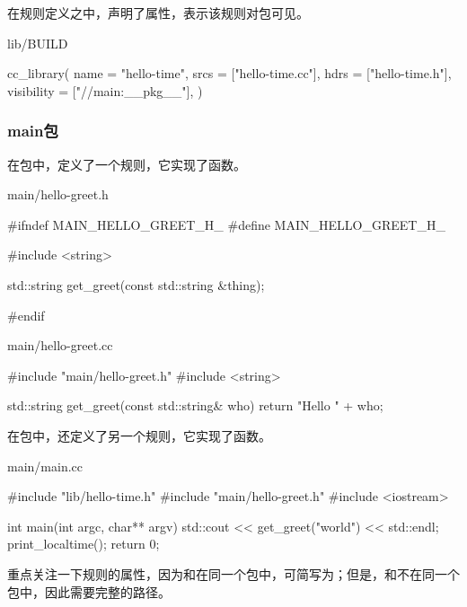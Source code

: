 \begin{content}
在规则定义之中，声明了属性，表示该规则对包可见。

\begin{nodiff}{lib/BUILD}
 \begin{python}
cc_library(
    name = "hello-time", 
    srcs = ["hello-time.cc"], 
    hdrs = ["hello-time.h"],  
    visibility = ["//main:__pkg__"],
)
 \end{python}
\end{nodiff}

\subsubsection{main包}

在包中，定义了一个规则，它实现了函数。

\begin{nodiff}{main/hello-greet.h}
 \begin{c++}
#ifndef MAIN_HELLO_GREET_H_
#define MAIN_HELLO_GREET_H_

#include <string>

std::string get_greet(const std::string &thing);
      
#endif
 \end{c++}
\end{nodiff}

\begin{nodiff}{main/hello-greet.cc}
 \begin{c++}
#include "main/hello-greet.h"             
#include <string>

std::string get_greet(const std::string& who) {
  return "Hello " + who;
}
 \end{c++}
\end{nodiff}

在包中，还定义了另一个规则，它实现了函数。

\begin{nodiff}{main/main.cc}
 \begin{c++}
#include "lib/hello-time.h"
#include "main/hello-greet.h"
#include <iostream>

int main(int argc, char** argv) {
  std::cout << get_greet("world") << std::endl;
  print_localtime();
  return 0;
}
 \end{c++}
\end{nodiff}

重点关注一下规则的属性，因为和在同一个包中，可简写为；但是，和不在同一个包中，因此需要完整的路径。



\end{content}
